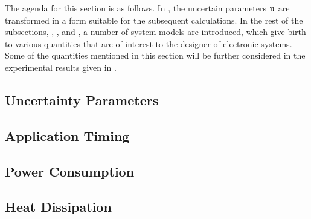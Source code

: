 The agenda for this section is as follows. In , the
uncertain parameters $\mathbf{u}$ are transformed in a form suitable for the subsequent
calculations. In the rest of the subsections, ,
, and , a number of system models
are introduced, which give birth to various quantities that are of interest to
the designer of electronic systems. Some of the quantities mentioned in this
section will be further considered in the experimental results given in
.

\subsection{Uncertainty Parameters} 


\subsection{Application Timing} 


\subsection{Power Consumption} 


\subsection{Heat Dissipation} 

